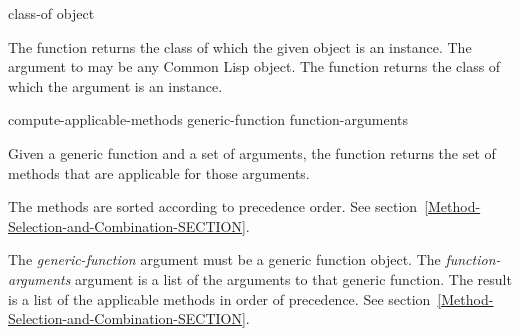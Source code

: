 \begin{defun}[Function]
class-of object

The function  returns the class of which
the given object is an instance.
The argument to  may be any Common Lisp object.
The function  returns the class of which
the argument is an instance.

\end{defun}


\begin{defun}[Function]
compute-applicable-methods generic-function function-arguments

Given a generic function and a set of arguments, the function
 returns the set of methods
that are applicable for those arguments.

The methods are
sorted according to precedence order.
See section~\ref{Method-Selection-and-Combination-SECTION}.





The \emph{generic-function\/} argument must be a generic function object.
The \emph{function-arguments\/} argument is a list of the arguments to
that generic function.
The result is a list of the applicable methods in order of precedence.
See section~\ref{Method-Selection-and-Combination-SECTION}.
\end{defun}


